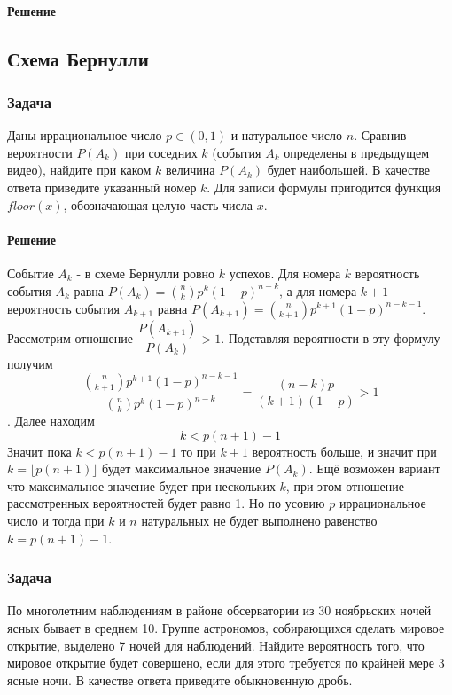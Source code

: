 \documentclass[a4paper,12pt]{article}
\begin{document}
\paragraph{Решение}


\subsection{Схема Бернулли}
\subsubsection*{Задача}
Даны иррациональное число \(p \in (0,1)\) и натуральное число \(n\). Сравнив вероятности \(P(A_k)\) при соседних \(k\) (события \(A_k\) определены в предыдущем видео), найдите при каком \(k\) величина \(P(A_k)\) будет наибольшей. В качестве ответа приведите указанный номер \(k\). Для записи формулы пригодится функция \(floor(x)\), обозначающая целую часть числа \(x\).
\paragraph{Решение}
Событие \(A_k\) - в схеме Бернулли ровно \(k\) успехов. Для номера \(k\) вероятность события \(A_k\) равна \(P(A_k)=\binom{n}{k}p^k(1-p)^{n-k}\), а для  номера \(k+1\) вероятность события \(A_{k+1}\) равна \(P(A_{k+1})=\binom{n}{k+1}p^{k+1}(1-p)^{n-k-1}\). Рассмотрим отношение \( \dfrac{P(A_{k+1})}{P(A_{k})}> 1 \). Подставляя вероятности в эту формулу получим 
\[ \dfrac{\binom{n}{k+1}p^{k+1}(1-p)^{n-k-1}}{\binom{n}{k}p^{k}(1-p)^{n-k}} = \dfrac{(n-k)p}{(k+1)(1-p)} > 1 \]. 
Далее находим \[ k < p(n+1) -1 \]
Значит пока \( k <  p(n+1) -1 \) то при \(k+1\) вероятность больше, и значит при 
\( k = \lfloor p(n+1) \rfloor \) будет максимальное значение \(P(A_k)\).
Ещё возможен вариант что максимальное  значение  будет при нескольких  \(k\),  при этом  отношение рассмотренных вероятностей будет равно 1. Но по усовию \(p\) иррациональное число и тогда при \(k\) и \(n\) натуральных не будет выполнено равенство \(k = p(n+1) -1\).


\subsubsection*{Задача}
По многолетним наблюдениям в районе обсерватории из 30 ноябрьских ночей ясных бывает в среднем 10. Группе астрономов, собирающихся сделать мировое открытие, выделено 7 ночей для наблюдений. Найдите вероятность того, что мировое открытие будет совершено, если для этого требуется по крайней мере 3 ясные ночи. В качестве ответа приведите обыкновенную дробь.
\end{document}
